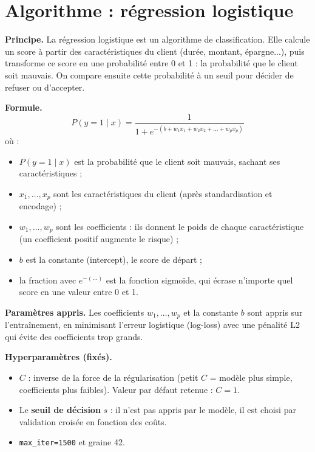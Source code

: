 \documentclass[11pt,a4paper]{article}
\begin{document}
\section{Algorithme : régression logistique}
\textbf{Principe.} La régression logistique est un algorithme de classification. Elle calcule un score à partir des caractéristiques du client (durée, montant, épargne...), puis transforme ce score en une probabilité entre 0 et 1 : la probabilité que le client soit mauvais. On compare ensuite cette probabilité à un seuil pour décider de refuser ou d'accepter.

\textbf{Formule.}
\begin{equation}
P(y=1\mid x)=\frac{1}{1+e^{-(b+w_1x_1+w_2x_2+\dots+w_px_p)}}
\end{equation}
où :
\begin{itemize}[nosep]
  \item $P(y=1\mid x)$ est la probabilité que le client soit mauvais, sachant ses caractéristiques ;
  \item $x_1,\dots,x_p$ sont les caractéristiques du client (après standardisation et encodage) ;
  \item $w_1,\dots,w_p$ sont les coefficients : ils donnent le poids de chaque caractéristique (un coefficient positif augmente le risque) ;
  \item $b$ est la constante (intercept), le score de départ ;
  \item la fraction avec $e^{-(\dots)}$ est la fonction sigmoïde, qui écrase n'importe quel score en une valeur entre 0 et 1.
\end{itemize}

\textbf{Paramètres appris.} Les coefficients $w_1,\dots,w_p$ et la constante $b$ sont appris sur l'entraînement, en minimisant l'erreur logistique (log-loss) avec une pénalité L2 qui évite des coefficients trop grands.

\textbf{Hyperparamètres (fixés).}
\begin{itemize}[nosep]
  \item $C$ : inverse de la force de la régularisation (petit $C$ = modèle plus simple, coefficients plus faibles). Valeur par défaut retenue : $C=1$.
  \item Le \textbf{seuil de décision} $s$ : il n'est pas appris par le modèle, il est choisi par validation croisée en fonction des coûts.
  \item \texttt{max\_iter=1500} et graine 42.
\end{itemize}
\end{document}
